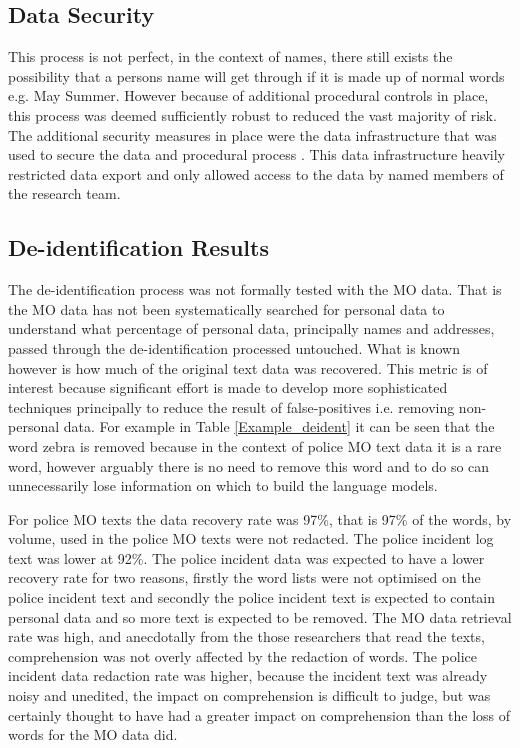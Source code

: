 \subsection{Data Security} This process is not perfect, in the context of names, there still exists the possibility that a persons name will get through if it is made up of normal words e.g. May Summer. However because of additional procedural controls in place, this process was deemed sufficiently robust to reduced the vast majority of risk. The additional security measures in place were the data infrastructure that was used to secure the data and procedural process . This data infrastructure heavily restricted data export and only allowed access to the data by named members of the research team. 

\subsection{De-identification Results} The de-identification process was not formally tested with the MO data. That is the MO data has not been systematically searched for personal data to understand what percentage of personal data, principally names and addresses, passed through the de-identification processed untouched. What is known however is how much of the original text data was recovered. This metric is of interest because significant effort is made to develop more sophisticated techniques principally to reduce the result of false-positives i.e. removing non-personal data. For example in Table \ref{Example_deident} it can be seen that the word zebra is removed because in the context of police MO text data it is a rare word, however arguably there is no need to remove this word and to do so can unnecessarily lose information on which to build the language models. 

For police MO texts the data recovery rate was 97\%, that is 97\% of the words, by volume,  used in the police MO texts were not redacted. The police incident log  text was lower at 92\%. The police incident data was expected to have a lower recovery rate for two reasons, firstly the word lists were not optimised on the police incident text and secondly the police incident text is expected to contain personal data and so more text is expected to be removed. The MO data retrieval rate was high, and anecdotally from the those researchers that read the texts, comprehension was not overly affected by the redaction of words. The police incident data redaction rate was higher, because the incident text was already noisy and unedited, the impact on comprehension is difficult to judge, but was certainly thought to have had a greater impact on comprehension than the loss of words for the MO data did.  

